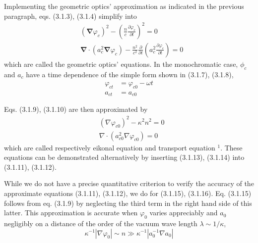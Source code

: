 \documentclass{article}
\begin{document}
Implementing the geometric optics' approximation as indicated in the previous paragraph, eqs. (3.1.3), (3.1.4) simplify into
$$
\begin{align*}
& \left(\boldsymbol{\nabla} \varphi_{c}\right)^{2}-\left(\frac{n}{c} \frac{\partial \varphi_{c}}{\partial t}\right)^{2}=0  \tag{3.1.11}\\
& \boldsymbol{\nabla} \cdot\left(a_{c}^{2} \boldsymbol{\nabla} \varphi_{c}\right)-\frac{n^{2}}{c^{2}} \frac{\partial}{\partial t}\left(a_{c}^{2} \frac{\partial \varphi_{c}}{\partial t}\right)=0 \tag{3.1.12}
\end{align*}
$$
which are called the geometric optics' equations. In the monochromatic case, $\phi_{c}$ and $a_{c}$ have a time dependence of the simple form shown in (3.1.7), (3.1.8),
$$
\begin{align*}
\varphi_{c t} & =\varphi_{c 0}-\omega t  \tag{3.1.13}\\
a_{c t} & =a_{c 0} \tag{3.1.14}
\end{align*}
$$

Eqs. (3.1.9), (3.1.10) are then approximated by
$$
\begin{align*}
& \left(\nabla \varphi_{c 0}\right)^{2}-\kappa^{2} n^{2}=0  \tag{3.1.15}\\
& \nabla \cdot\left(a_{c 0}^{2} \nabla \varphi_{c 0}\right)=0 \tag{3.1.16}
\end{align*}
$$
which are called respectively eikonal equation and transport equation ${ }^{1}$. These
equations can be demonstrated alternatively by inserting (3.1.13), (3.1.14) into (3.1.11), (3.1.12).

While we do not have a precise quantitative criterion to verify the accuracy of the approximate equations (3.1.11), (3.1.12), we do for (3.1.15), (3.1.16). Eq. (3.1.15) follows from eq. (3.1.9) by neglecting the third term in the right hand side of this latter. This approximation is accurate when $\varphi_{0}$ varies appreciably and $a_{0}$ negligibly on a distance of the order of the vacuum wave length $\lambda \sim 1 / \kappa$,
$$
\begin{equation*}
\kappa^{-1}\left|\nabla \varphi_{0}\right| \sim n \gg \kappa^{-1}\left|a_{0}^{-1} \nabla a_{0}\right| \tag{3.1.17}
\end{equation*}
$$
\end{document}
